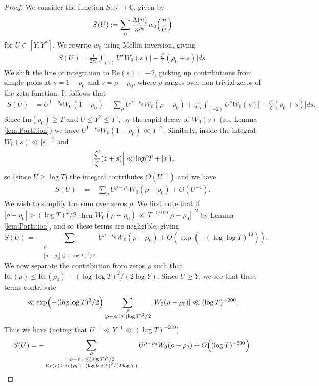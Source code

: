 \documentclass[12pt]{amsart}
\theoremstyle{plain}
\theoremstyle{definition}
\theoremstyle{remark}
\begin{document}
\begin{proof}
 We consider the function $S:\mathbb{R}\rightarrow\mathbb{C}$, given by
\begin{align*}
S(U) := \sum_n \frac{\Lambda(n)}{n^{\rho_0}} w_0\Bigl(\frac{n}{U} \Bigr)
\end{align*}
%
for $U \in [Y,Y^2]$. We rewrite $w_0$ using Mellin inversion, giving
%
\begin{align*}
S(U) = \frac{1}{2\pi i}\int_{(1)} U^s W_0(s)\Big[ -\frac{\zeta'}{\zeta}(\rho_0 + s)\Big] ds.
\end{align*}
%
We shift the line of integration to $\text{Re}(s) = -2$, picking up contributions from simple poles at $s = 1-\rho_0$ and $s = \rho-\rho_0$, where $\rho$ ranges over non-trivial zeros of the zeta function. It follows that
%
\begin{align*}
S(U) &= U^{1-\rho_0}W_0(1-\rho_0) - \sum_{\rho}U^{\rho - \rho_0} W_0(\rho-\rho_0) + \frac{1}{2\pi i}\int_{(-2)} U^s W_0(s)\Big[ -\frac{\zeta'}{\zeta}(\rho_0 + s)\Big] ds.
\end{align*}
%
Since $\text{Im}(\rho_0)\geq T$ and $U\le Y^2\le T^4$, by the rapid decay of $W_0(s)$ (see Lemma \ref{lem:Partition}) we have $U^{1-\rho_0}W_0(1-\rho_0)\ll T^{-2}$. Similarly, inside the integral $W_0(s)\ll |s|^{-2}$ and 
%
\begin{align*}
\Bigl|\frac{\zeta'}{\zeta}(z + s) \Bigr| \ll \log (T + |s|),
\end{align*}
%
so (since $U\ge \log T$) the integral contributes $O(U^{-1})$ and we have
%
\begin{align*}
S(U) &= - \sum_{\rho}U^{\rho - \rho_0} W_0(\rho-\rho_0) + O(U^{-1}).
\end{align*}
%
We wish to simplify the sum over zeros $\rho$. We first note that if $|\rho-\rho_0|>(\log{T})^2/2$ then $W_0(\rho-\rho_0)\ll T^{-1/100}|\rho-\rho_0|^{-2}$ by Lemma \ref{lem:Partition}, and so these terms are negligible, giving
%
\[
S(U) = - \sum_{\substack{\rho\\ |\rho-\rho_0|\le (\log{T})^2/2}}U^{\rho - \rho_0} W_0(\rho-\rho_0) + O(\exp(-(\log \log T)^{10})).
\]
%
We now separate the contribution from zeros $\rho$ such that $\text{Re}(\rho)\le \text{Re}(\rho_0)-(\log\log{T})^2/(2\log{Y})$. Since $U\ge Y$, we see that these terms contribute
%
\[
\ll \exp\Bigl(-(\log\log{T})^2/2\Bigr)\sum_{\substack{\rho\\ |\rho-\rho_0|\le (\log{T})^2/2}} |W_0(\rho-\rho_0)|\ll (\log{T})^{-200}.
\]
%
Thus we have (noting that $U^{-1}\ll Y^{-1}\ll (\log{T})^{-200}$)
%
\[
S(U) = - \sum_{\substack{\rho\\ |\rho-\rho_0|\le (\log{T})^2/2\\ \text{Re}(\rho)\ge \text{Re}(\rho_0)-(\log\log{T})^2/(2\log{Y})}}U^{\rho - \rho_0} W_0(\rho-\rho_0) + O\Bigl((\log T)^{-200}\Bigr).
\]
\end{proof}
\end{document}
